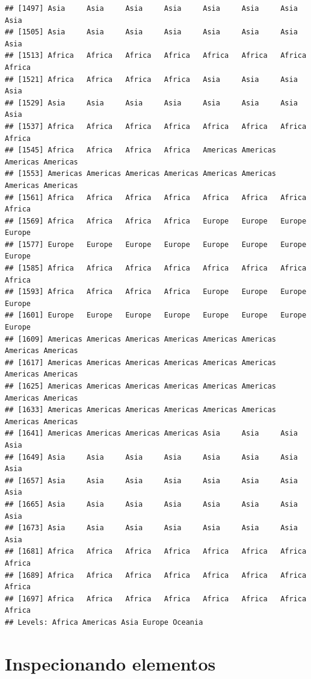 \documentclass[
]{article}
\newenvironment{Shaded}{\begin{snugshade}}{\end{snugshade}}
\newcommand{\CommentTok}[1]{\textcolor[rgb]{0.56,0.35,0.01}{\textit{#1}}}
\newcommand{\KeywordTok}[1]{\textcolor[rgb]{0.13,0.29,0.53}{\textbf{#1}}}
\newcommand{\NormalTok}[1]{#1}
\newcommand{\OperatorTok}[1]{\textcolor[rgb]{0.81,0.36,0.00}{\textbf{#1}}}
\begin{document}
\begin{verbatim}
## [1497] Asia     Asia     Asia     Asia     Asia     Asia     Asia     Asia    
## [1505] Asia     Asia     Asia     Asia     Asia     Asia     Asia     Asia    
## [1513] Africa   Africa   Africa   Africa   Africa   Africa   Africa   Africa  
## [1521] Africa   Africa   Africa   Africa   Asia     Asia     Asia     Asia    
## [1529] Asia     Asia     Asia     Asia     Asia     Asia     Asia     Asia    
## [1537] Africa   Africa   Africa   Africa   Africa   Africa   Africa   Africa  
## [1545] Africa   Africa   Africa   Africa   Americas Americas Americas Americas
## [1553] Americas Americas Americas Americas Americas Americas Americas Americas
## [1561] Africa   Africa   Africa   Africa   Africa   Africa   Africa   Africa  
## [1569] Africa   Africa   Africa   Africa   Europe   Europe   Europe   Europe  
## [1577] Europe   Europe   Europe   Europe   Europe   Europe   Europe   Europe  
## [1585] Africa   Africa   Africa   Africa   Africa   Africa   Africa   Africa  
## [1593] Africa   Africa   Africa   Africa   Europe   Europe   Europe   Europe  
## [1601] Europe   Europe   Europe   Europe   Europe   Europe   Europe   Europe  
## [1609] Americas Americas Americas Americas Americas Americas Americas Americas
## [1617] Americas Americas Americas Americas Americas Americas Americas Americas
## [1625] Americas Americas Americas Americas Americas Americas Americas Americas
## [1633] Americas Americas Americas Americas Americas Americas Americas Americas
## [1641] Americas Americas Americas Americas Asia     Asia     Asia     Asia    
## [1649] Asia     Asia     Asia     Asia     Asia     Asia     Asia     Asia    
## [1657] Asia     Asia     Asia     Asia     Asia     Asia     Asia     Asia    
## [1665] Asia     Asia     Asia     Asia     Asia     Asia     Asia     Asia    
## [1673] Asia     Asia     Asia     Asia     Asia     Asia     Asia     Asia    
## [1681] Africa   Africa   Africa   Africa   Africa   Africa   Africa   Africa  
## [1689] Africa   Africa   Africa   Africa   Africa   Africa   Africa   Africa  
## [1697] Africa   Africa   Africa   Africa   Africa   Africa   Africa   Africa  
## Levels: Africa Americas Asia Europe Oceania
\end{verbatim}

\hypertarget{inspecionando-elementos-4}{%
\section{Inspecionando elementos}\label{inspecionando-elementos-4}}

\begin{Shaded}
\end{Shaded}
\end{document}
